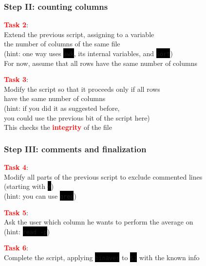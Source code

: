 \documentclass[unknownkeysallowed, 10pt, a4 paper, handout]{beamer}
\newcommand{\focus}[1]{\textbf{\textcolor{red}{#1}}}
\newcommand{\code}[1]{\colorbox{black}{\color{green}\texttt{#1}}}
\begin{document}
\begin{frame}
	\begin{center}
		\frametitle{Step II: counting columns}

		\focus{Task 2}:\\
		Extend the previous script, assigning to a variable\\
		the number of columns of the same file\\
		(hint: one way uses \code{awk}, its internal variables, and \code{sort})\\
		For now, assume that all rows have the same number of columns

		\vspace{8mm}

		\focus{Task 3}:\\
		Modify the script so that it proceeds only if all rows\\
		have the same number of columns\\
		(hint: if you did it as suggested before,\\
		you could use the previous bit of the script here)\\
		This checks the \focus{integrity} of the file

	\end{center}
\end{frame}


\begin{frame}
	\begin{center}
		\frametitle{Step III: comments and finalization}

		\focus{Task 4}:\\
		Modify all parts of the previous script to exclude commented lines\\
		(starting with \code{\#})\\
		(hint: you can use \code{grep})

		\vspace{4mm}

		\focus{Task 5}:\\
		Ask the user which column he wants to perform the average on\\
		(hint: \code{read -p})

		\vspace{4mm}

		\focus{Task 6}:\\
		Complete the script, applying \code{binaver} to \code{\$1} with the known info
	\end{center}
\end{frame}
\end{document}
